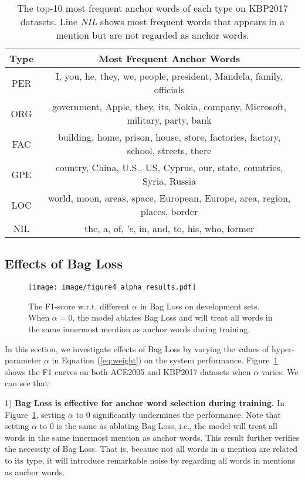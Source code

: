 \documentclass[11pt,a4paper]{article}
\begin{document}
\begin{table*}
\begin{center}
\begin{tabular}{|c|c|}
\hline
\textbf{Type} & \textbf{Most Frequent Anchor Words }\\ \hline
PER & I, you, he, they, we, people, president, Mandela, family, officials \\ \hline
ORG & government, Apple, they, its, Nokia, company, Microsoft, military, party, bank \\ \hline
FAC & building, home, prison, house, store, factories, factory, school, streets, there \\ \hline
GPE & country, China, U.S., US, Cyprus, our, state, countries, Syria, Russia \\ \hline
LOC & world, moon, areas, space, European, Europe, area, region, places, border \\ \hline \hline
NIL & the, a, of, 's, in, and, to, his, who, former \\ \hline
\end{tabular}
\end{center}
\caption{The top-10 most frequent anchor words of each type on KBP2017 datasets. Line \emph{NIL} shows most frequent words that appears in a mention but are not regarded as anchor words.}
\label{tab:frequent_head_words}
\end{table*}

\subsection{Effects of Bag Loss}
\label{sec:ana_bagloss}

\begin{figure}
  \centering
  \setlength{\belowcaptionskip}{-0.5cm}
  \texttt{[image: image/figure4\_alpha\_results.pdf]}\\
  \caption{The F1-score w.r.t. different $\alpha$ in Bag Loss on development sets. When $\alpha=0$, the model ablates Bag Loss and will treat all words in the same innermost mention as anchor words during training.}
  \label{fig:alpha}
\end{figure}
In this section, we investigate effects of Bag Loss by varying the values of hyper-parameter $\alpha$ in Equation (\ref{eq:weight}) on the system performance. Figure~\ref{fig:alpha} shows the F1 curves on both ACE2005 and KBP2017 datasets when $\alpha$ varies. We can see that:

1) \textbf{Bag Loss is effective for anchor word selection during training.} In Figure~\ref{fig:alpha}, setting $\alpha$ to 0 significantly undermines the performance. Note that setting $\alpha$ to 0 is the same as ablating Bag Loss, i.e., the model will treat all words in the same innermost mention as anchor words. This result further verifies the necessity of Bag Loss. That is, because not all words in a mention are related to its type, it will introduce remarkable noise by regarding all words in mentions as anchor words.
\end{document}
